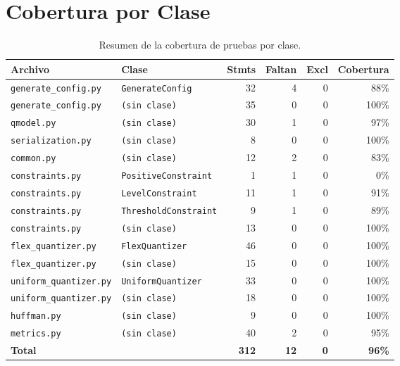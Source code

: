 \section{Cobertura por Clase}
\begin{table}[H]
\centering
\caption{Resumen de la cobertura de pruebas por clase.}
\label{tab:coverage_class}
\scriptsize
\begin{tabularx}{\textwidth}{XXrrrr}
\toprule
\textbf{Archivo} & \textbf{Clase} & \textbf{Stmts} & \textbf{Faltan} & \textbf{Excl} & \textbf{Cobertura} \\
\midrule
\texttt{generate\_config.py} & \texttt{GenerateConfig} & 32 & 4 & 0 & 88\% \\
\texttt{generate\_config.py} & \texttt{(sin clase)} & 35 & 0 & 0 & 100\% \\
\texttt{qmodel.py} & \texttt{(sin clase)} & 30 & 1 & 0 & 97\% \\
\texttt{serialization.py} & \texttt{(sin clase)} & 8 & 0 & 0 & 100\% \\
\texttt{common.py} & \texttt{(sin clase)} & 12 & 2 & 0 & 83\% \\
\texttt{constraints.py} & \texttt{PositiveConstraint} & 1 & 1 & 0 & 0\% \\
\texttt{constraints.py} & \texttt{LevelConstraint} & 11 & 1 & 0 & 91\% \\
\texttt{constraints.py} & \texttt{ThresholdConstraint} & 9 & 1 & 0 & 89\% \\
\texttt{constraints.py} & \texttt{(sin clase)} & 13 & 0 & 0 & 100\% \\
\texttt{flex\_quantizer.py} & \texttt{FlexQuantizer} & 46 & 0 & 0 & 100\% \\
\texttt{flex\_quantizer.py} & \texttt{(sin clase)} & 15 & 0 & 0 & 100\% \\
\texttt{uniform\_quantizer.py} & \texttt{UniformQuantizer} & 33 & 0 & 0 & 100\% \\
\texttt{uniform\_quantizer.py} & \texttt{(sin clase)} & 18 & 0 & 0 & 100\% \\
\texttt{huffman.py} & \texttt{(sin clase)} & 9 & 0 & 0 & 100\% \\
\texttt{metrics.py} & \texttt{(sin clase)} & 40 & 2 & 0 & 95\% \\
\midrule
\textbf{Total} & & \textbf{312} & \textbf{12} & \textbf{0} & \textbf{96\%} \\
\bottomrule
\end{tabularx}
\end{table}
